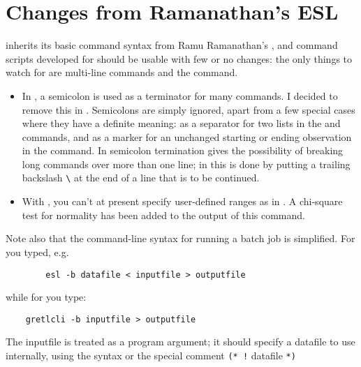 \section{Changes from Ramanathan's ESL}
\label{cli-syntax}

 inherits its basic
      command syntax from Ramu Ramanathan's
      , and command scripts developed
      for  should be usable with few or
      no changes: the only things to watch for are multi-line commands
      and the  command.
    
\begin{itemize}
\item In , a semicolon is used
	  as a terminator for many commands.  I decided to remove this
	  in . Semicolons are
	  simply ignored, apart from a few special cases where they
	  have a definite meaning: as a separator for two lists in the
	   and  commands,
	  and as a marker for an unchanged starting or ending
	  observation in the  command. In
	   semicolon termination gives
	  the possibility of breaking long commands over more than one
	  line; in  this is done by
	  putting a trailing backslash \verb+\+ at the end
	  of a line that is to be continued.
	
\item With , you can't at present
	  specify user-defined ranges as in
	  .  A chi-square test for
	  normality has been added to the output of this command.
	
\end{itemize}


      Note also that the command-line syntax for running a batch job
      is simplified. For  you typed,
      e.g. 
      
\begin{verbatim} 
        esl -b datafile < inputfile > outputfile
      \end{verbatim}
 while for 
      you type: 
      
\begin{verbatim}
	gretlcli -b inputfile > outputfile
      \end{verbatim}
 The inputfile is treated as a program
      argument; it should specify a datafile to use internally, using
      the syntax   or the special
      comment \verb+(* !+
      datafile \verb+*)+
    

